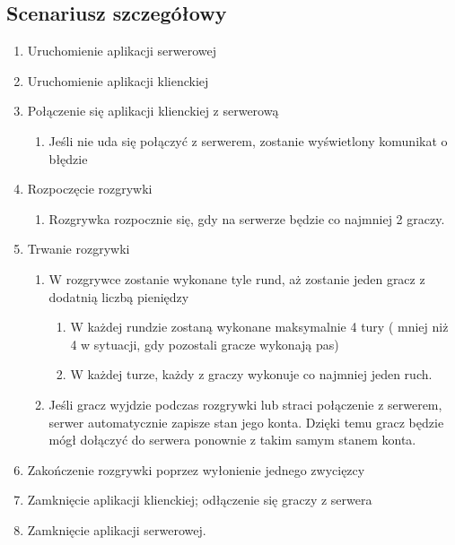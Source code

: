 \documentclass{article}
\begin{document}
    \subsection{Scenariusz szczegółowy}
        \begin{enumerate}
            \item Uruchomienie aplikacji serwerowej
            \item Uruchomienie aplikacji klienckiej
            \item Połączenie się aplikacji klienckiej z serwerową
            \begin{enumerate}
                \item Jeśli nie uda się połączyć z serwerem, zostanie wyświetlony komunikat o błędzie
            \end{enumerate}
            \item Rozpoczęcie rozgrywki
                \begin{enumerate}
                    \item Rozgrywka rozpocznie się, gdy na serwerze będzie co najmniej 2 graczy.
                \end{enumerate}
            \item Trwanie rozgrywki
            \begin{enumerate}
                \item W rozgrywce zostanie wykonane tyle rund, aż zostanie jeden gracz z dodatnią liczbą pieniędzy
                \begin{enumerate}
                    \item W każdej rundzie zostaną wykonane maksymalnie 4 tury ( mniej niż 4 w sytuacji, gdy pozostali gracze wykonają pas)
                    \item W każdej turze, każdy z graczy wykonuje co najmniej jeden ruch.
                \end{enumerate}
                \item Jeśli gracz wyjdzie podczas rozgrywki lub straci połączenie z serwerem, serwer automatycznie zapisze stan jego konta. Dzięki temu gracz będzie mógł dołączyć do serwera ponownie z takim samym stanem konta.
            \end{enumerate}
            \item Zakończenie rozgrywki poprzez wyłonienie jednego zwycięzcy
            \item Zamknięcie aplikacji klienckiej; odłączenie się graczy z serwera
            \item Zamknięcie aplikacji serwerowej.
        \end{enumerate}
    
\end{document}
